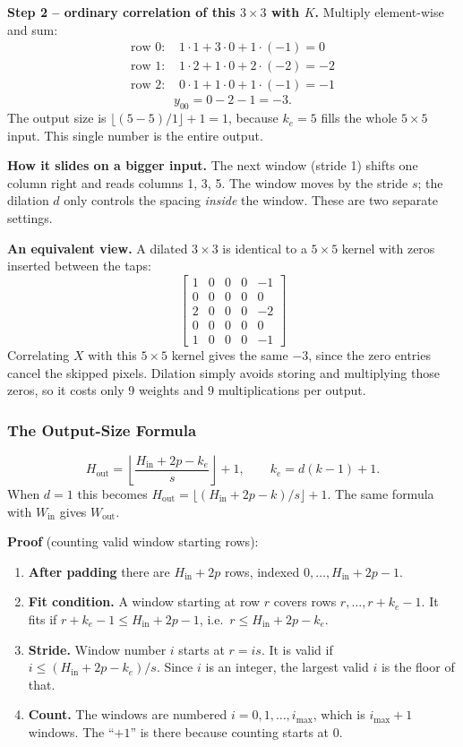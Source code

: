 \textbf{Step 2 -- ordinary correlation of this $3\times3$ with $K$.} Multiply element-wise and sum:
\begin{align*}
\text{row 0: } & 1\cdot1+3\cdot0+1\cdot(-1)=0\\
\text{row 1: } & 1\cdot2+1\cdot0+2\cdot(-2)=-2\\
\text{row 2: } & 0\cdot1+1\cdot0+1\cdot(-1)=-1
\end{align*}
\[
y_{00}=0-2-1=-3.
\]
The output size is $\lfloor(5-5)/1\rfloor+1=1$, because $k_e=5$ fills the whole $5\times5$ input. This single number is the entire output.

\textbf{How it slides on a bigger input.} The next window (stride 1) shifts one column right and reads columns 1, 3, 5. The window moves by the stride $s$; the dilation $d$ only controls the spacing \emph{inside} the window. These are two separate settings.

\textbf{An equivalent view.} A dilated $3\times3$ is identical to a $5\times5$ kernel with zeros inserted between the taps:
\[
\begin{bmatrix}
1&0&0&0&-1\\
0&0&0&0&0\\
2&0&0&0&-2\\
0&0&0&0&0\\
1&0&0&0&-1
\end{bmatrix}
\]
Correlating $X$ with this $5\times5$ kernel gives the same $-3$, since the zero entries cancel the skipped pixels. Dilation simply avoids storing and multiplying those zeros, so it costs only 9 weights and 9 multiplications per output.

\subsubsection*{The Output-Size Formula}

\[
H_{\text{out}}=\left\lfloor\frac{H_{\text{in}}+2p-k_e}{s}\right\rfloor+1,\qquad k_e=d(k-1)+1.
\]
When $d=1$ this becomes $H_{\text{out}}=\lfloor(H_{\text{in}}+2p-k)/s\rfloor+1$. The same formula with $W_{\text{in}}$ gives $W_{\text{out}}$.

\textbf{Proof} (counting valid window starting rows):
\begin{enumerate}
  \item \textbf{After padding} there are $H_{\text{in}}+2p$ rows, indexed $0,\dots,H_{\text{in}}+2p-1$.
  \item \textbf{Fit condition.} A window starting at row $r$ covers rows $r,\dots,r+k_e-1$. It fits if $r+k_e-1\le H_{\text{in}}+2p-1$, i.e.\ $r\le H_{\text{in}}+2p-k_e$.
  \item \textbf{Stride.} Window number $i$ starts at $r=is$. It is valid if $i\le(H_{\text{in}}+2p-k_e)/s$. Since $i$ is an integer, the largest valid $i$ is the floor of that.
  \item \textbf{Count.} The windows are numbered $i=0,1,\dots,i_{\max}$, which is $i_{\max}+1$ windows. The ``$+1$'' is there because counting starts at 0.
\end{enumerate}

